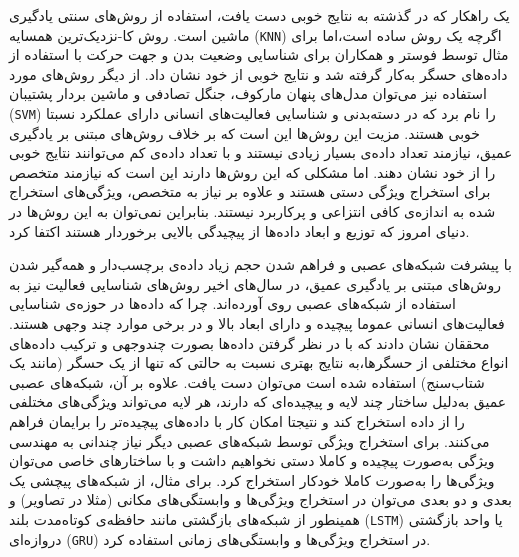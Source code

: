 یک راهکار که در گذشته به نتایج خوبی دست یافت، استفاده از روش‌های سنتی یادگیری ماشین است. روش
کا-نزدیک‌ترین همسایه (\verb|KNN|)
اگرچه یک روش ساده است،‌اما برای مثال توسط
فوستر و همکاران\cite{foerster1999detection}
برای شناسایی وضعیت بدن و جهت حرکت با استفاده از داده‌های حسگر به‌کار گرفته شد و نتایج خوبی از خود نشان داد. از دیگر روش‌های مورد استفاده نیز می‌توان
مدل‌های پنهان مارکوف\cite{asghari2018activity}،
جنگل تصادفی\cite{attal2015physical}
و ماشین بردار پشتیبان (\verb|SVM|)\cite{attal2015physical}
را نام برد که در دسته‌بدنی و شناسایی فعالیت‌های انسانی دارای عملکرد نسبتا خوبی هستند. مزیت این روش‌ها این است که بر خلاف روش‌های مبتنی بر یادگیری عمیق،‌ نیازمند تعداد داده‌ی بسیار زیادی نیستند و با تعداد داده‌ی کم می‌توانند نتایج خوبی را از خود نشان دهند\cite{chen2021deep}.
اما مشکلی که این روش‌ها دارند این است که نیازمند متخصص برای
استخراج ویژگی دستی
هستند و علاوه بر نیاز به متخصص، ویژگی‌های استخراج شده به اندازه‌ی کافی
انتزاعی
و پرکاربرد نیستند. بنابراین نمی‌توان به این روش‌ها در دنیای امروز که توزیع و ابعاد داده‌ها از پیچیدگی بالایی برخوردار هستند اکتفا کرد.

با پیشرفت شبکه‌های عصبی و فراهم شدن حجم زیاد داده‌ی برچسب‌دار و همه‌گیر شدن روش‌های مبتنی بر یادگیری عمیق، در سال‌های اخیر روش‌های شناسایی فعالیت نیز به استفاده از شبکه‌های عصبی روی آورده‌اند. چرا که داده‌ها در حوزه‌ی شناسایی فعالیت‌های انسانی عموما پیچیده و دارای ابعاد بالا و در برخی موارد چند وجهی هستند. محققان نشان دادند که با در نظر گرفتن داده‌ها بصورت چندوجهی و ترکیب داده‌های انواع مختلفی از حسگرها،‌به نتایج بهتری نسبت به حالتی که تنها از یک حسگر (مانند یک شتاب‌سنج) استفاده شده است می‌توان دست یافت\cite{guo2016wearable}.
علاوه بر آن، شبکه‌های عصبی عمیق به‌دلیل ساختار چند لایه و پیچیده‌ای که دارند، هر لایه می‌تواند ویژگی‌های مختلفی را از داده استخراج کند و نتیجتا امکان کار با داده‌های پیچیده‌تر را برایمان فراهم می‌کنند. برای استخراج ویژگی توسط شبکه‌های عصبی دیگر نیاز چندانی به مهندسی ویژگی به‌صورت پیچیده و کاملا دستی نخواهیم داشت و با ساختارهای خاصی می‌توان ویژگی‌ها را به‌صورت کاملا خودکار استخراج کرد. برای مثال، از شبکه‌های پیچشی یک بعدی و دو بعدی می‌توان در استخراج ویژگی‌ها و
وابستگی‌های مکانی
(مثلا در تصاویر)
و همینطور از شبکه‌های بازگشتی
مانند حافظه‌ی کوتاه‌مدت بلند (\verb|LSTM|)
یا واحد بازگشتی دروازه‌ای (\verb|GRU|)
در استخراج ویژگی‌ها و وابستگی‌های زمانی استفاده کرد.

